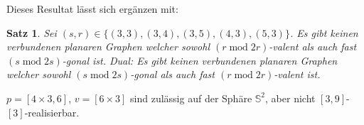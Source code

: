 \documentclass[10pt, notheorems]{beamer}
\newtheorem{theorem}{Satz}[section]
\newcommand{\set}[1]{\{ #1 \}}
\newcommand{\sphere}{\mathbb{S}}
\renewcommand{\mod}{\operatorname{mod}}
\begin{document}
\begin{frame}
  Dieses Resultat lässt sich ergänzen mit:
  \begin{theorem}
    Sei $(s, r) \in \set{(3, 3), (3, 4), (3, 5), (4, 3), (5, 3)}$. Es gibt keinen verbundenen planaren Graphen welcher sowohl $(r \mod 2r)$-valent als auch fast $(s \mod 2s)$-gonal ist. Dual: Es gibt keinen verbundenen planaren Graphen welcher sowohl $(s \mod 2s)$-gonal als auch fast $(r \mod 2r)$-valent ist. 
  \end{theorem}

  \begin{example}
    $p = [4 \times 3, 6]$, $v = [6 \times 3]$ sind zulässig auf der Sphäre $\sphere^2$, aber nicht $[3, 9]$-$[3]$-realisierbar.
  \end{example}
\end{frame}
\end{document}
